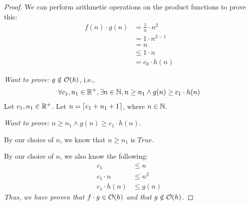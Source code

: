 \documentclass[12pt]{article}
\theoremstyle{definition}
\begin{document}
\begin{enumerate}
\begin{proof}
                We can perform arithmetic operations on the product functions to prove this:
                \begin{align*}
                    f(n) \cdot g(n) &= \frac{1}{n} \cdot n^2\\
                    &= 1\cdot n^{2 - 1}\\
                    &= n\\
                    &\leq 1 \cdot n\\
                    &=c_0 \cdot h(n) \tag{from our choice of $c_0$ and $h(n)$}
                \end{align*}
                
                
                \emph{Want to prove:} $g \notin \mathcal O (h)$, i.e.,
                \begin{align*}
                    \forall c_1, n_1 \in \mathbb R^+, \exists n \in \mathbb N, n \geq n_1 \land g(n) \geq c_{1} \cdot h(n)
                \end{align*}
                Let $c_1, n_1 \in \mathbb R^+$.
                Let $n = \left \lceil c_1 + n_1 + 1 \right \rceil$, where $n \in \mathbb N$.
                
                \emph{Want to prove:} $n \geq n_1 \land g(n) \geq c_1 \cdot h(n)$.
                
                By our choice of $n$, we know that $n \geq n_1$ is $True$.
                
                By our choice of $n$, we also know the following:
                \begin{align*}
                    c_1 &\leq n\\
                    c_1 \cdot n &\leq n^2\\
                    c_1 \cdot h(n) &\leq g(n)
                \end{align*}
                \emph{Thus, we have proven that $f \cdot g \in \mathcal O(h)$ and that $g \notin \mathcal O (h)$.}
            \end{proof}
    \end{enumerate}
\end{document}
